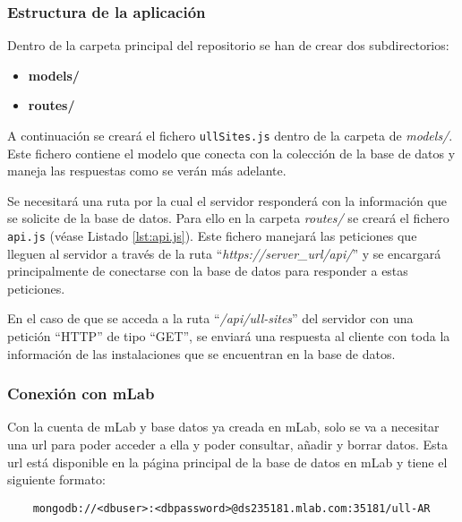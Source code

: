 \subsubsection{Estructura de la aplicación}

Dentro de la carpeta principal del repositorio se han de crear dos subdirectorios:

\begin{itemize}
    \item \textbf{models/}
    \item \textbf{routes/}
\end{itemize}

A continuación se creará el fichero \texttt{ullSites.js} dentro de la carpeta de \textit{models/}. Este fichero contiene el modelo que conecta con la colección de la base de datos y maneja las respuestas como se verán más adelante.   


Se necesitará una ruta por la cual el servidor responderá con la información que se solicite de la base de datos. Para ello en la carpeta \textit{routes/} se creará el fichero \texttt{api.js} (véase Listado \ref{lst:api.js}). Este fichero manejará las peticiones que lleguen al servidor a través de la ruta ``\textit{https://server\_url/api/}'' y se encargará principalmente de conectarse con la base de datos para responder a estas peticiones.

 
En el caso de que se acceda a la ruta ``\textit{/api/ull-sites}'' del servidor con una petición ``HTTP'' de tipo ``GET'', se enviará una respuesta al cliente con toda la información de las instalaciones que se encuentran en la base de datos.

\subsubsection{Conexión con mLab}

Con la cuenta de mLab y base datos ya creada en mLab, solo se va a necesitar una url para poder acceder a ella y poder consultar, añadir y borrar datos. Esta url está disponible en la página principal de la base de datos en mLab y tiene el siguiente formato:

\begin{lstlisting}
    mongodb://<dbuser>:<dbpassword>@ds235181.mlab.com:35181/ull-AR
\end{lstlisting}

